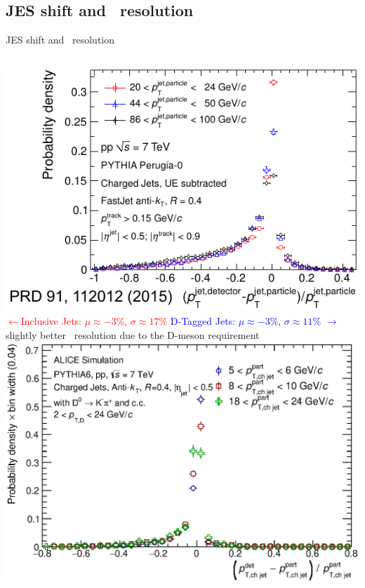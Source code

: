 \documentclass[xcolor={usenames,dvipsnames}]{beamer}
\begin{document}
\subsection{JES shift and \pt\ resolution}
\begin{frame}{JES shift and \pt\ resolution}

\begin{columns}
\includegraphics[width=\textwidth]{img/ALICE_JetRes}
\centering
\textcolor{red}{$\leftarrow$Inclusive Jets: $\mu\approx -3\%$, \textbf{$\sigma\approx17\%$}}
\textcolor{blue}{D-Tagged Jets: $\mu\approx -3\%$, \textbf{$\sigma\approx11\%$ }$\rightarrow$}
slightly better \pt\ resolution due to the D-meson requirement
\includegraphics[width=\textwidth]{img/HQ16_Simulation_DetectorResponse}
\end{columns}

\end{frame}
\end{document}
